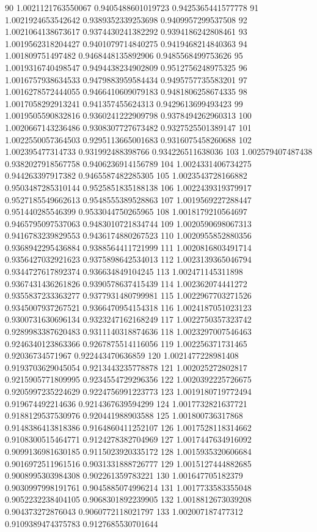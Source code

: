 90	1.0021121763550067	0.9405488601019723	0.9425365441577778
91	1.0021924653542642	0.9389352339253698	0.9409957299537508
92	1.0021064138673617	0.9374430241382292	0.9394186242808461
93	1.0019562318204427	0.9401079714840275	0.9419468214840363
94	1.001809751497482	0.9468448135892906	0.9485568499753626
95	1.0019316740498547	0.9494438234902809	0.9512756248975325
96	1.0016757938634533	0.9479883959584434	0.9495757735583201
97	1.0016278572444055	0.9466410609079183	0.9481806258674335
98	1.0017058292913241	0.941357455624313	0.9429613699493423
99	1.0019505590832816	0.9360241222909798	0.9378494262960313
100	1.0020667143236486	0.9308307727673482	0.9327525501389147
101	1.0022550057364503	0.9295113665001683	0.9316075458260688
102	1.002395477314733	0.931992488398766	0.934226511638036
103	1.002579407487438	0.9382027918567758	0.9406236914156789
104	1.0024331406734275	0.944263397917382	0.9465587482285305
105	1.0023543728166882	0.9503487285310144	0.9525851835188138
106	1.0022439319379917	0.9527185549662613	0.9548555389528863
107	1.0019569227288447	0.951440285546399	0.9533044750265965
108	1.0018179210564697	0.9465795097537063	0.9483010721834744
109	1.0020590698067313	0.9416783239829553	0.9436174880267523
110	1.0020955852880356	0.9368942295436884	0.9388564411721999
111	1.0020816803491714	0.9356427032921623	0.9375898642534013
112	1.0023139365046794	0.9344727617892374	0.936634849104245
113	1.002471145311898	0.9367431436261826	0.9390578637415439
114	1.002362074441272	0.9355837233363277	0.9377931480799981
115	1.0022967703271526	0.9345007937267521	0.9366470954154318
116	1.0024187051023123	0.9300731630696134	0.9323247162168249
117	1.0022750357323742	0.9289983387620483	0.9311140318874636
118	1.0023297007546463	0.9246340123863366	0.9267875514116056
119	1.002256371731465	0.92036734571967	0.922443470636859
120	1.0021477228981408	0.9193703629045054	0.9213443235778878
121	1.002025272802817	0.9215905771809995	0.9234554729296356
122	1.0020392225726675	0.9205997235224629	0.9224756991223773
123	1.0019180719772494	0.919674492214636	0.9214367639594299
124	1.0017732821637721	0.9188129537530976	0.920441988903588
125	1.001800736317868	0.9148386413818386	0.9164860411252107
126	1.0017528118314662	0.9108300515464771	0.9124278382704969
127	1.0017447634916092	0.9099136981630185	0.9115023920335172
128	1.0015935320606684	0.9016972511961516	0.9031331888726777
129	1.0015127444882685	0.9008995303984308	0.902261359783221
130	1.001647705182379	0.9030997998191761	0.9045885074996214
131	1.0017733583355048	0.9052232238404105	0.9068301892239905
132	1.0018812673039208	0.904373272876043	0.9060772118021797
133	1.002007187477312	0.9109389474375783	0.9127685530701644
